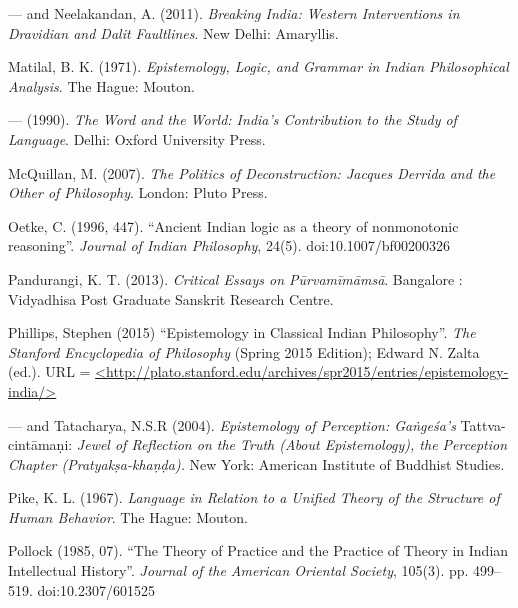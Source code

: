 \begin{thebibliography}{99}
--- and Neelakandan, A. (2011). {\sl Breaking India: Western Interventions in Dravidian and Dalit Faultlines}. New Delhi: Amaryllis.

Matilal, B. K. (1971). {\sl Epistemology, Logic, and Grammar in Indian Philosophical Analysis}. The Hague: Mouton.

--- (1990). {\sl The Word and the World: India's Contribution to the Study of Language}. Delhi: Oxford University Press.

McQuillan, M. (2007). {\sl The Politics of Deconstruction: Jacques Derrida and the Other of Philosophy}. London: Pluto Press.

Oetke, C. (1996, 447). ``Ancient Indian logic as a theory of nonmonotonic reasoning''. {\sl Journal of Indian Philosophy}, 24(5). doi:10.1007/bf00200326


Pandurangi, K. T. (2013). {\sl Critical Essays on Pūrvamīmāmsā}. Bangalore : Vidyadhisa Post Graduate Sanskrit Research Centre.

Phillips, Stephen (2015) ``Epistemology in Classical Indian Philosophy''. {\sl The Stanford Encyclopedia of Philosophy} (Spring 2015 Edition); Edward N. Zalta (ed.). URL = \url{<http://plato.stanford.edu/archives/spr2015/entries/epistemology-india/>}

--- and Tatacharya, N.S.R (2004). {\sl Epistemology of Perception: Gaṅgeśa's} Tattva-cintāmaṇi: {\em Jewel of Reflection on the Truth (About Epistemology), the Perception Chapter (Pratyakṣa-khaṇḍa).} New York: American Institute of Buddhist Studies.


Pike, K. L. (1967). {\sl Language in Relation to a Unified Theory of the Structure of Human Behavior}. The Hague: Mouton.

Pollock (1985, 07). ``The Theory of Practice and the Practice of Theory in Indian Intellectual History''. {\sl Journal of the American Oriental Society}, 105(3). pp. 499--519. doi:10.2307/601525


\end{thebibliography}
